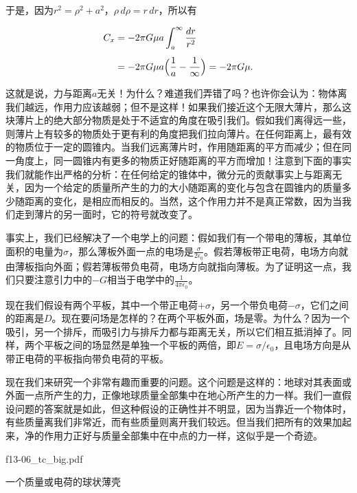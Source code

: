 \documentclass[12pt,oneside]{book}
\begin{document}
于是，因为$r^{2}=\rho^{2}+a^{2}$，$\rho\,d\rho = r\,dr$，所以有

\begin{equation}
\begin{aligned}
C_x&=-2\pi G\mu a\int_a^\infty\frac{dr}{r^2}\\[1ex]
&= -2\pi G\mu a\Bigl(\frac{1}{a}-\frac{1}{\infty}\Bigr)=-2\pi G\mu.
\end{aligned}
\label{Eq:I:13:17}
\end{equation}

这就是说，力与距离$a$无关！为什么？难道我们弄错了吗？也许你会认为：物体离我们越远，作用力应该越弱；但不是这样！如果我们接近这个无限大薄片，那么这块薄片上的绝大部分物质是处于不适宜的角度在吸引我们。假如我们离得远一些，则薄片上有较多的物质处于更有利的角度把我们拉向薄片。在任何距离上，最有效的物质位于一定的圆锥内。当我们远离薄片时，作用随距离的平方而减少；但在同一角度上，同一圆锥内有更多的物质正好随距离的平方而增加！注意到下面的事实我们就能作出严格的分析：在任何给定的锥体中，微分元的贡献事实上与距离无关，因为一个给定的质量所产生的力的大小随距离的变化与包含在圆锥内的质量多少随距离的变化，是相应而相反的。当然，这个作用力并不是真正常数，因为当我们走到薄片的另一面时，它的符号就改变了。


事实上，我们已经解决了一个电学上的问题：假如我们有一个带电的薄板，其单位面积的电量为$\sigma$，那么薄板外面一点的电场是$\frac{\sigma}{2\epsilon_{0}}$。假若薄板带正电荷，电场方向就由薄板指向外面；假若薄板带负电荷，电场方向就指向薄板。为了证明这一点，我们只要注意引力中的$-G$相当于电学中的$\frac{1}{4\pi\epsilon_{0}}$。


现在我们假设有两个平板，其中一个带正电荷$+\sigma$，另一个带负电荷$-\sigma$，它们之间的距离是$D$。现在要问场是怎样的？在两个平板外面，场是零。为什么？因为一个吸引，另一个排斥，而吸引力与排斥力都与距离无关，所以它们相互抵消掉了。同样，两个平板之间的场显然是单独一个平板的两倍，即$E=\sigma/\epsilon_{0}$，且电场方向是从带正电荷的平板指向带负电荷的平板。


现在我们来研究一个非常有趣而重要的问题。这个问题是这样的：地球对其表面或外面一点所产生的力，正像地球质量全部集中在地心所产生的力一样。我们一直假设问题的答案就是如此，但这种假设的正确性并不明显，因为当靠近一个物体时，有些质量离我们非常近，而有些质量则离开我们较远。但当我们把所有的效果加起来，净的作用力正好与质量全部集中在中点的力一样，这似乎是一个奇迹。

\begin{fig}{f13-06_tc_big.pdf}
\caption{一个质量或电荷的球状薄壳}
\label{fig:13-6}
\end{fig}
\end{document}
